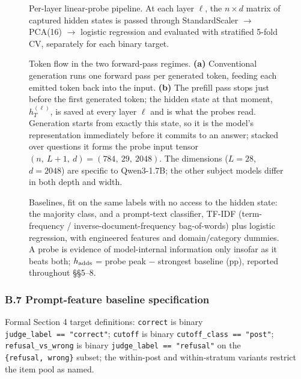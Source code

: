 \begin{figure}
\centering

\caption{Per-layer linear-probe pipeline. At each layer $\ell$, the $n \times d$ matrix
of captured hidden states is passed through StandardScaler $\to$ PCA(16) $\to$ logistic
regression and evaluated with stratified 5-fold CV, separately for each binary target.}
\label{fig:pipeline}
\end{figure}

\begin{figure}
\centering

\caption{Token flow in the two forward-pass regimes. \textbf{(a)} Conventional
generation runs one forward pass per generated token, feeding each emitted token back
into the input. \textbf{(b)} The prefill pass stops just before the first generated
token; the hidden state at that moment, $h^{(\ell)}_T$, is saved at every layer $\ell$
and is what the probes read. Generation starts from exactly this state, so it is the
model's representation immediately before it commits to an answer; stacked over
questions it forms the probe input tensor $(n,\ L{+}1,\ d) = (784,\ 29,\ 2048)$. The
dimensions ($L{=}28$, $d{=}2048$) are specific to Qwen3-1.7B; the other subject models
differ in both depth and width.}
\label{fig:tokenflow}
\end{figure}

\begin{figure}
\centering

\caption{Baselines, fit on the same labels with no access to the hidden state: the
majority class, and a prompt-text classifier, TF-IDF (term-frequency /
inverse-document-frequency bag-of-words) plus logistic regression, with engineered
features and domain/category dummies. A probe is evidence of model-internal information
only insofar as it beats both; $h_{\rm adds}$ = probe peak $-$ strongest baseline (pp),
reported throughout \S\S5--8.}
\label{fig:baselines}
\end{figure}

\subsubsection{B.7 Prompt-feature baseline
specification}\label{b.7-prompt-feature-baseline-specification}

Formal Section 4 target definitions: \texttt{correct} is binary
\texttt{judge\_label\ ==\ "correct"}; \texttt{cutoff} is binary
\texttt{cutoff\_class\ ==\ "post"}; \texttt{refusal\_vs\_wrong} is
binary \texttt{judge\_label\ ==\ "refusal"} on the
\texttt{\{refusal,\ wrong\}} subset; the within-post and within-stratum
variants restrict the item pool as named.


